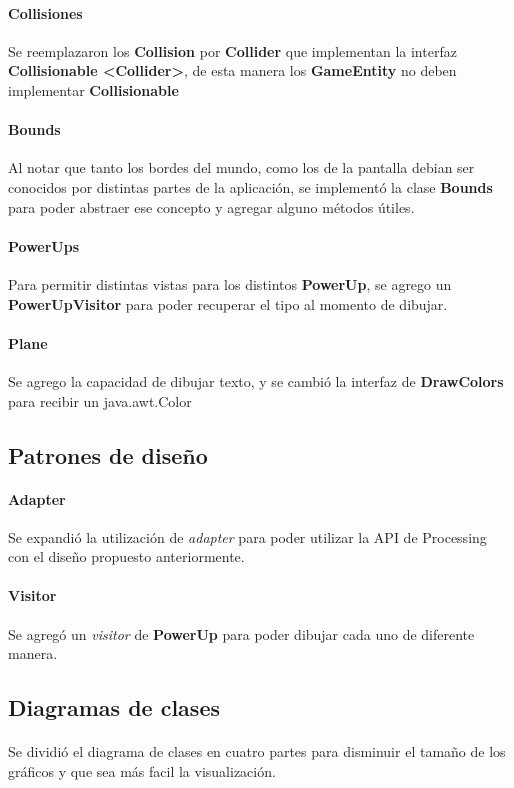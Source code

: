 \documentclass[a4paper,10pt]{extarticle}
\begin{document}
        \paragraph{Collisiones}
        Se reemplazaron los \textbf{Collision} por \textbf{Collider} que implementan la interfaz \textbf{Collisionable \textless Collider\textgreater}, de esta manera los \textbf{GameEntity} no deben implementar \textbf{Collisionable}

        \paragraph{Bounds}
        Al notar que tanto los bordes del mundo, como los de la pantalla debian ser conocidos por distintas partes de la aplicación, se implementó la clase \textbf{Bounds} para poder abstraer ese concepto y agregar alguno métodos útiles.

        \paragraph{PowerUps}
        Para permitir distintas vistas para los distintos \textbf{PowerUp}, se agrego un \textbf{PowerUpVisitor} para poder recuperar el tipo al momento de dibujar.

        \paragraph{Plane}
        Se agrego la capacidad de dibujar texto, y se cambió la interfaz de \textbf{DrawColors} para recibir un java.awt.Color

        
    \subsection{Patrones de diseño}
        \paragraph{Adapter}
        Se expandió la utilización de \textit{adapter} para poder utilizar la API de Processing con el diseño propuesto anteriormente.

        \paragraph{Visitor}
        Se agregó un \textit{visitor} de \textbf{PowerUp} para poder dibujar cada uno de diferente manera.

    \subsection{Diagramas de clases}
        \paragraph{}
        Se dividió el diagrama de clases en cuatro partes para disminuir el tamaño de los gráficos y que sea más facil la visualización.
        
    
\end{document}
